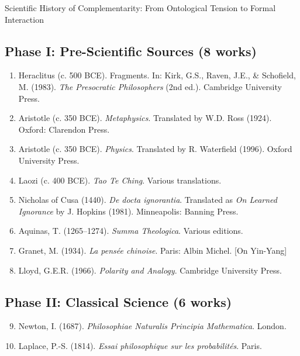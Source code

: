 \begin{chapter}{Scientific History of Complementarity: From Ontological Tension to Formal Interaction}
\subsection{Phase I: Pre-Scientific Sources (8 works)}

\begin{enumerate}
    \item Heraclitus (c. 500 BCE). Fragments. In: Kirk, G.S., Raven, J.E., \& Schofield, M. (1983). \textit{The Presocratic Philosophers} (2nd ed.). Cambridge University Press.

    \item Aristotle (c. 350 BCE). \textit{Metaphysics}. Translated by W.D. Ross (1924). Oxford: Clarendon Press.

    \item Aristotle (c. 350 BCE). \textit{Physics}. Translated by R. Waterfield (1996). Oxford University Press.

    \item Laozi (c. 400 BCE). \textit{Tao Te Ching}. Various translations.

    \item Nicholas of Cusa (1440). \textit{De docta ignorantia}. Translated as \textit{On Learned Ignorance} by J. Hopkins (1981). Minneapolis: Banning Press.

    \item Aquinas, T. (1265--1274). \textit{Summa Theologica}. Various editions.

    \item Granet, M. (1934). \textit{La pensée chinoise}. Paris: Albin Michel. [On Yin-Yang]

    \item Lloyd, G.E.R. (1966). \textit{Polarity and Analogy}. Cambridge University Press.
\end{enumerate}

\subsection{Phase II: Classical Science (6 works)}

\begin{enumerate}
    \setcounter{enumi}{8}
    \item Newton, I. (1687). \textit{Philosophiae Naturalis Principia Mathematica}. London.

    \item Laplace, P.-S. (1814). \textit{Essai philosophique sur les probabilités}. Paris.


\end{enumerate}
\end{chapter}
